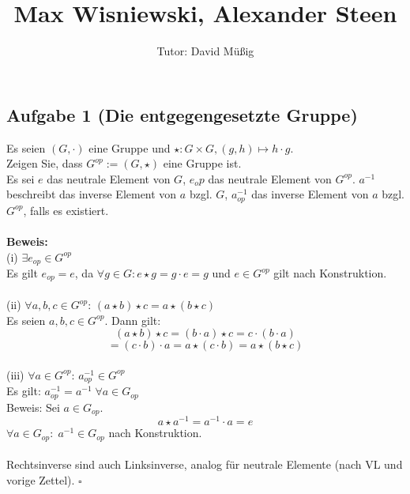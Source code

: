 \documentclass[11pt,a4paper,ngerman]{article}
\author{Tutor: David Müßig}
\date{}
\title{Max Wisniewski, Alexander Steen}
\begin{document}

\maketitle
\thispagestyle{fancy}


\subsection*{Aufgabe 1 \mdseries (Die entgegengesetzte Gruppe)}
Es seien $(G, \cdot)$ eine Gruppe und $\star : G \times G, (g,h) \mapsto h \cdot g$. \\
Zeigen Sie, dass $G^{op} := (G, \star)$ eine Gruppe ist. \\
Es sei $e$ das neutrale Element von $G$, $e_op$ das neutrale Element von $G^{op}$. $a^{-1}$ beschreibt das inverse Element von $a$ bzgl. $G$, $a_{op}^{-1}$ das inverse Element von $a$ bzgl. $G^{op}$, falls es existiert.\\ \\
\textbf{Beweis:}\\
(i) $\exists e_{op} \in G^{op}$ \\
Es gilt $e_{op} = e$, da $\forall g\in G: e \star g = g \cdot e = g$ und $e \in G^{op}$ gilt nach Konstruktion. 
\\ \\
(ii) $\forall a,b,c \in G^{op}:\,(a \star b) \star c = a \star (b \star c)$ \\
Es seien $a,b,c \in G^{op}$. Dann gilt: \\
$$ (a \star b) \star c = (b \cdot a) \star c = c \cdot (b \cdot a) $$
$$ = (c \cdot b) \cdot a = a \star (c \cdot b) = a \star (b \star c)$$
\\
(iii) $\forall a \in G^{op}: \, a_{op}^{-1} \in G^{op}$ \\
Es gilt: $a_{op}^{-1} = a^{-1} \; \forall a \in G_{op}$ \\
Beweis: 
Sei $a \in G_{op}$.
$$ a \star a^{-1} = a^{-1} \cdot a = e$$
$\forall a \in G_{op}: \; a^{-1} \in G_{op}$ nach Konstruktion.
\\ \\
Rechtsinverse sind auch Linksinverse, analog für neutrale Elemente (nach VL und vorige Zettel).
\mbox{} \hfill $\square$\\
\end{document}
